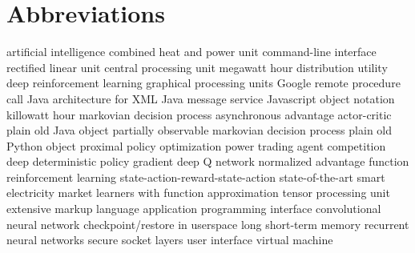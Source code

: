 \newpage
\section*{Abbreviations}
\begin        {acronym}[PowerTAC]
	       {artificial intelligence}
	      {combined heat and power unit}
	      {command-line interface}
         {rectified linear unit}
	      {central processing unit}
          {megawatt hour}
	       {distribution utility}
	   {deep reinforcement learning}
	      {graphical processing units}
	     {Google remote procedure call}
	     {Java architecture for XML}
	      {Java message service}
	     {Javascript object notation}
          {killowatt hour}
	      {markovian decision process}
          {asynchronous advantage actor-critic}
	     {plain old Java object}
	    {partially observable markovian decision process}
	     {plain old Python object}
	      {proximal policy optimization}
	 {power trading agent competition}
         {deep deterministic policy gradient}
          {deep Q network}
          {normalized advantage function}
	       {reinforcement learning}
	    {state-action-reward-state-action}
	     {state-of-the-art}
         {smart electricity market learners with function approximation}
	      {tensor processing unit}
	      {extensive markup language}
          {application programming interface}
          {convolutional neural network}
         {checkpoint/restore in userspace}
         {long short-term memory}
          {recurrent neural networks}
          {secure socket layers}
           {user interface}
           {virtual machine}

\end{acronym}
